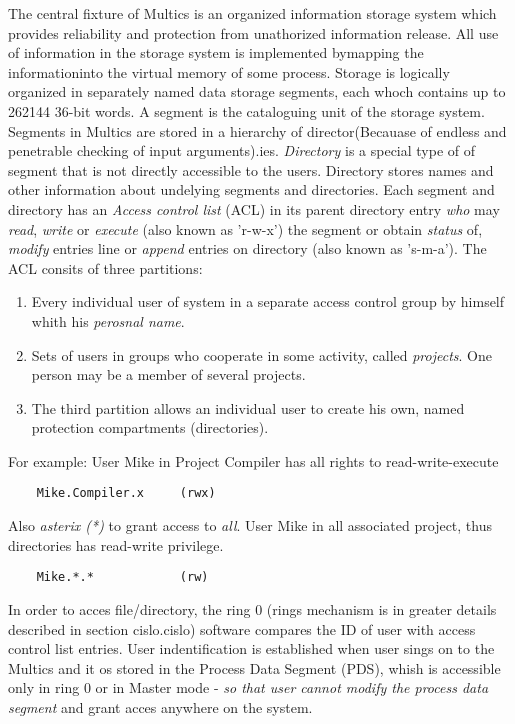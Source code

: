 The central fixture of Multics is an organized information storage system which provides reliability and 
protection from unathorized information release. All use of information in the storage system is implemented 
bymapping the informationinto the virtual memory of some process. Storage is logically organized in separately 
named data storage segments, each whoch contains up to 262144 36-bit words. A segment is the cataloguing unit of 
the storage system.
Segments in Multics are stored in a hierarchy of director(Becauase of endless and penetrable checking of input arguments).ies. \textit{Directory} is a special type of of
segment that is not directly accessible to the users.
Directory stores names and other information about undelying segments and directories.
Each segment and directory has an \textit{Access control list} (ACL) in its parent directory entry
\textit{who} may \textit{read}, \textit{write} or \textit{execute} (also known as 'r-w-x') the segment or obtain 
\textit{status} of, \textit{modify} entries line or \textit{append} entries on directory (also known as 's-m-a').
The ACL consits of three partitions:
\begin{enumerate}
    \item Every individual user of system in a separate access control group by himself whith his \textit{perosnal name}.
    \item Sets of users in groups who cooperate in some activity, called \textit{projects}. One person may be a member of 
    several projects.
    \item  The third partition allows an individual user to create his own, named protection compartments (directories).
\end{enumerate}

For example:
User Mike in Project Compiler has all rights to read-write-execute
\begin{lstlisting}
    Mike.Compiler.x     (rwx)
\end{lstlisting}

Also \textit{asterix (*)} to grant access to \textit{all}.
User Mike in all associated project, thus directories has read-write privilege.
\begin{lstlisting}
    Mike.*.*            (rw)
\end{lstlisting}
In order to acces file/directory, the ring 0 (rings mechanism is in greater details described in section cislo.cislo) 
software compares the ID of user with access control list entries.
User indentification is established when user sings on to the Multics and it os stored in the Process Data 
Segment (PDS), whish is accessible only in ring 0 or in Master mode - \textit{so that user cannot modify the
process data segment} and grant acces anywhere on the system.


